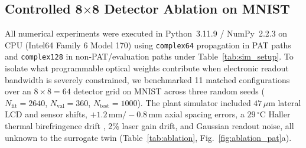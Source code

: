 \documentclass[journal]{IEEEtran}
\begin{document}
\subsection{Controlled 8$\times$8 Detector Ablation on MNIST}
All numerical experiments were executed in Python~3.11.9 / NumPy~2.2.3 on CPU (Intel64 Family 6 Model 170) using \texttt{complex64} propagation in PAT paths and \texttt{complex128} in non-PAT/evaluation paths under Table~\ref{tab:sim_setup}. To isolate what programmable optical weights contribute when electronic readout bandwidth is severely constrained, we benchmarked 11 matched configurations over an $8\times 8 = 64$ detector grid on MNIST \cite{lecun1998mnist} across three random seeds ($N_{\mathrm{fit}} = 2640$, $N_{\mathrm{val}} = 360$, $N_{\mathrm{test}} = 1000$). The plant simulator included $47\,\mu\text{m}$ lateral LCD and sensor shifts, $+1.2\,\text{mm}/-0.8\,\text{mm}$ axial spacing errors, a $29\,^\circ\text{C}$ Haller thermal birefringence drift \cite{haller1975thermodynamic,li2005lc}, 2\% laser gain drift, and Gaussian readout noise, all unknown to the surrogate twin (Table~\ref{tab:ablation}, Fig.~\ref{fig:ablation_pat}a).
\end{document}
